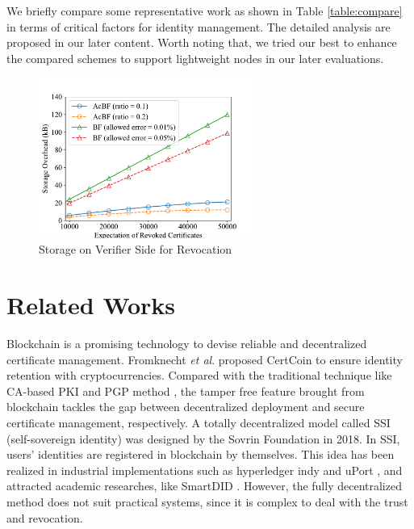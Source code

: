\documentclass[conference]{IEEEtran}
\begin{document}
We briefly compare some representative work as shown in Table \ref{table:compare} in terms of critical factors for identity management. The detailed analysis are proposed in our later content. %
Worth noting that, we tried our best to enhance the compared schemes to support lightweight nodes in our later evaluations. 

 




\begin{figure}[t]
	\centering
	\includegraphics[width=7cm]{storage_overhead}
	\caption{Storage on Verifier Side for Revocation}\label{fig:withBF}
\end{figure}

\section{Related Works}\label{section:related}
Blockchain is a promising technology to devise reliable and decentralized certificate management. Fromknecht \textit{et al}. 
\cite{fromknechtDecentralizedPublicKey} proposed CertCoin to ensure identity retention with cryptocurrencies.  
Compared with the traditional technique like CA-based PKI \cite{pki} and PGP method \cite{pgp}, the tamper free feature brought from blockchain tackles the gap between decentralized deployment and secure certificate management, respectively. 
A totally decentralized model called SSI (self-sovereign identity) \cite{foundation_sovrin_2018} was designed by the Sovrin Foundation in 2018. In SSI, users' identities are registered in blockchain by themselves. 
This idea has been realized in industrial implementations such as hyperledger indy \cite{indy} and uPort \cite{naik2020uport}, and attracted academic researches, like SmartDID \cite{smartdid}. However, the fully decentralized method does not suit practical systems, since it is complex to deal with the trust and revocation.
\end{document}
